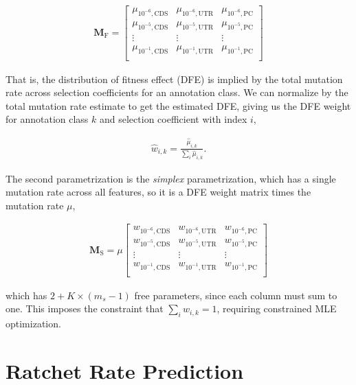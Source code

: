 \documentclass[11pt]{article}
\begin{document}
\begin{align}
  \mathbf{M}_\text{F} = \begin{bmatrix}
    \mu_{10^{-6},\text{CDS}} & \mu_{10^{-6},\text{UTR}} & \mu_{10^{-6},\text{PC}} \\
    \mu_{10^{-5},\text{CDS}} & \mu_{10^{-5},\text{UTR}} & \mu_{10^{-5},\text{PC}} \\
    \vdots & \vdots & \vdots \\
    \mu_{10^{-1},\text{CDS}} & \mu_{10^{-1},\text{UTR}} & \mu_{10^{-1},\text{PC}} \\
  \end{bmatrix}
\end{align}

That is, the distribution of fitness effect (DFE) is implied by
the total mutation rate across selection coefficients for an annotation class.
We can normalize by the total mutation rate estimate to get the estimated DFE,
giving us the DFE weight for annotation class $k$ and selection coefficient
with index $i$,

\begin{align}
  \widehat{w}_{i,k} = \frac{\widehat{\mu}_{i,k}}{\sum_i \widehat{\mu}_{i,k}}.
\end{align}

The second parametrization is the \emph{simplex} parametrization, which has a
single mutation rate across all features, so it is a DFE weight matrix times
the mutation rate $\mu$, 

\begin{align}
  \mathbf{M}_\text{S} = \mu \begin{bmatrix}
    w_{10^{-6},\text{CDS}} & w_{10^{-6},\text{UTR}} & w_{10^{-6},\text{PC}} \\
    w_{10^{-5},\text{CDS}} & w_{10^{-5},\text{UTR}} & w_{10^{-5},\text{PC}} \\
    \vdots & \vdots & \vdots \\
    w_{10^{-1},\text{CDS}} & w_{10^{-1},\text{UTR}} & w_{10^{-1},\text{PC}} \\
  \end{bmatrix}
\end{align}

which has $2 + K \times (m_s-1)$ free parameters, since each column must sum to
one. This imposes the constraint that $\sum_i w_{i,k} = 1$, requiring
constrained MLE optimization. 

\section{Ratchet Rate Prediction}
\end{document}
